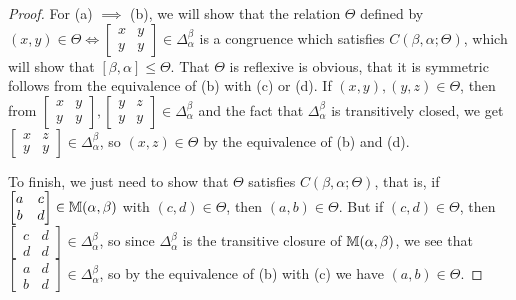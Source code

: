 \documentclass[letterpaper,11pt]{article}
\begin{document}
\begin{proof}
For (a) $\implies$ (b), we will show that the relation $\Theta$ defined by $(x,y) \in \Theta \iff \begin{bmatrix} x & y\\ y & y\end{bmatrix} \in \Delta_{\alpha}^{\beta}$ is a congruence which satisfies $C(\beta,\alpha;\Theta)$, which will show that $[\beta,\alpha] \le \Theta$. That $\Theta$ is reflexive is obvious, that it is symmetric follows from the equivalence of (b) with (c) or (d). If $(x,y), (y,z) \in \Theta$, then from $\begin{bmatrix} x & y\\ y & y\end{bmatrix}, \begin{bmatrix} y & z\\ y & y\end{bmatrix} \in \Delta_{\alpha}^{\beta}$ and the fact that $\Delta_{\alpha}^{\beta}$ is transitively closed, we get $\begin{bmatrix} x & z\\ y & y\end{bmatrix} \in \Delta_{\alpha}^{\beta}$, so $(x,z) \in \Theta$ by the equivalence of (b) and (d).

To finish, we just need to show that $\Theta$ satisfies $C(\beta,\alpha;\Theta)$, that is, if $\begin{bmatrix} a & c\\ b & d\end{bmatrix} \in \mathbb{M}(\alpha,\beta)$ with $(c,d) \in \Theta$, then $(a,b) \in \Theta$. But if $(c,d) \in \Theta$, then $\begin{bmatrix} c & d\\ d & d\end{bmatrix} \in \Delta_{\alpha}^{\beta}$, so since $\Delta_{\alpha}^{\beta}$ is the transitive closure of $\mathbb{M}(\alpha,\beta)$, we see that $\begin{bmatrix} a & d\\ b & d\end{bmatrix} \in \Delta_{\alpha}^{\beta}$, so by the equivalence of (b) with (c) we have $(a,b) \in \Theta$.
\end{proof}
\end{document}
